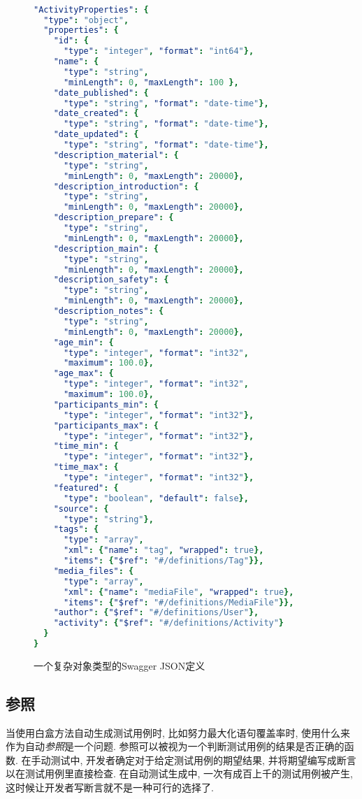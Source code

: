     \begin{figure}
      {
        \tt
        \scriptsize
      \begin{lstlisting}[language=yaml]
"ActivityProperties": { 
  "type": "object", 
  "properties": {
    "id": {
      "type": "integer", "format": "int64"},
    "name": {
      "type": "string",
      "minLength": 0, "maxLength": 100 },
    "date_published": { 
      "type": "string", "format": "date-time"},
    "date_created": { 
      "type": "string", "format": "date-time"},
    "date_updated": { 
      "type": "string", "format": "date-time"},
    "description_material": {
      "type": "string",
      "minLength": 0, "maxLength": 20000},
    "description_introduction": {
      "type": "string",
      "minLength": 0, "maxLength": 20000},
    "description_prepare": {
      "type": "string",
      "minLength": 0, "maxLength": 20000},
    "description_main": {
      "type": "string",
      "minLength": 0, "maxLength": 20000},
    "description_safety": {
      "type": "string",
      "minLength": 0, "maxLength": 20000},
    "description_notes": {
      "type": "string",
      "minLength": 0, "maxLength": 20000},
    "age_min": {
      "type": "integer", "format": "int32",
      "maximum": 100.0},
    "age_max": {
      "type": "integer", "format": "int32",
      "maximum": 100.0},
    "participants_min": {
      "type": "integer", "format": "int32"},
    "participants_max": { 
      "type": "integer", "format": "int32"},
    "time_min": { 
      "type": "integer", "format": "int32"},
    "time_max": { 
      "type": "integer", "format": "int32"},
    "featured": { 
      "type": "boolean", "default": false},
    "source": {
      "type": "string"},
    "tags": {
      "type": "array",
      "xml": {"name": "tag", "wrapped": true}, 
      "items": {"$ref": "#/definitions/Tag"}},
    "media_files": {
      "type": "array",
      "xml": {"name": "mediaFile", "wrapped": true}, 
      "items": {"$ref": "#/definitions/MediaFile"}},
    "author": {"$ref": "#/definitions/User"}, 
    "activity": {"$ref": "#/definitions/Activity"}
  }
}
        \end{lstlisting}
        }
        \caption{一个复杂对象类型的Swagger JSON定义}
        \label{fig2}
    \end{figure}
    
    \subsection{参照}
    当使用白盒方法自动生成测试用例时, 比如努力最大化语句覆盖率时, 使用什么来作为自动\textit{参照}是一个问题\cite{barr2015oracle}. 参照可以被视为一个判断测试用例的结果是否正确的函数. 在手动测试中, 开发者确定对于给定测试用例的期望结果, 并将期望编写成断言以在测试用例里直接检查. 在自动测试生成中, 一次有成百上千的测试用例被产生, 这时候让开发者写断言就不是一种可行的选择了. 
        
